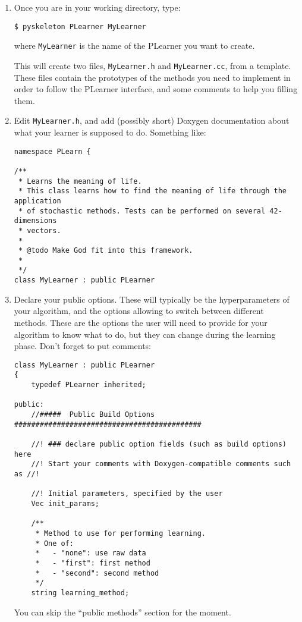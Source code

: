 \documentclass[11pt]{book}
\begin{document}
\begin{enumerate}
\item Once you are in your working directory, type:
\begin{verbatim}
$ pyskeleton PLearner MyLearner
\end{verbatim}
where {\tt MyLearner} is the name of the PLearner you want to create.

This will create two files, {\tt MyLearner.h} and {\tt MyLearner.cc},
from a template. These files contain the prototypes of the methods you
need to implement in order to follow the PLearner interface, and some
comments to help you filling them.

\item Edit {\tt MyLearner.h}, and add (possibly short) Doxygen
documentation about what your learner is supposed to do. Something like:
\begin{verbatim}
namespace PLearn {

/**
 * Learns the meaning of life.
 * This class learns how to find the meaning of life through the application
 * of stochastic methods. Tests can be performed on several 42-dimensions
 * vectors.
 *
 * @todo Make God fit into this framework.
 *
 */
class MyLearner : public PLearner
\end{verbatim}

\item Declare your public options. These will typically be the
hyperparameters of your algorithm, and the options allowing to switch
between different methods. These are the options the user will need
to provide for your algorithm to know what to do, but they can change
during the learning phase. Don't forget to put comments:
\begin{verbatim}
class MyLearner : public PLearner
{
    typedef PLearner inherited;

public:
    //#####  Public Build Options  ############################################

    //! ### declare public option fields (such as build options) here
    //! Start your comments with Doxygen-compatible comments such as //!

    //! Initial parameters, specified by the user
    Vec init_params;

    /**
     * Method to use for performing learning.
     * One of:
     *   - "none": use raw data
     *   - "first": first method
     *   - "second": second method
     */
    string learning_method;
\end{verbatim}
You can skip the ``public methods'' section for the moment.


\end{enumerate}
\end{document}
